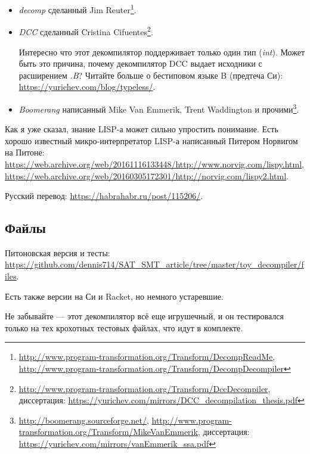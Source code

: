 \begin{itemize}
	\item \textit{decomp} сделанный Jim Reuter\footnote{
			\url{http://www.program-transformation.org/Transform/DecompReadMe},
			\url{http://www.program-transformation.org/Transform/DecompDecompiler}}.

	\item \textit{DCC} сделанный Cristina Cifuentes\footnote{
			\url{http://www.program-transformation.org/Transform/DccDecompiler},
			диссертация: \url{https://yurichev.com/mirrors/DCC_decompilation_thesis.pdf}}.

		Интересно что этот декомпилятор поддерживает только один тип (\textit{int}).
		Может быть это причина, почему декомпилятор DCC выдает исходники с расширением \textit{.B}?
		Читайте больше о бестиповом языке B (предтеча Си): \url{https://yurichev.com/blog/typeless/}.

	\item \textit{Boomerang} написанный Mike Van Emmerik, Trent Waddington и прочими\footnote{
			\url{http://boomerang.sourceforge.net/},
			\url{http://www.program-transformation.org/Transform/MikeVanEmmerik},
			диссертация: \url{https://yurichev.com/mirrors/vanEmmerik_ssa.pdf}}.
\end{itemize}

Как я уже сказал, знание LISP-а может сильно упростить понимание.
Есть хорошо известный микро-интерпретатор LISP-а написанный Питером Норвигом на Питоне:
\url{https://web.archive.org/web/20161116133448/http://www.norvig.com/lispy.html},
\url{https://web.archive.org/web/20160305172301/http://norvig.com/lispy2.html}.

Русский перевод: \url{https://habrahabr.ru/post/115206/}.

\subsection{Файлы}

Питоновская версия и тесты: \url{https://github.com/dennis714/SAT_SMT_article/tree/master/toy_decompiler/files}.

Есть также версии на Си и Racket, но немного устаревшие.

Не забывайте --- этот декомпилятор всё еще игрушечный, и он тестировался только на тех крохотных тестовых файлах,
что идут в комплекте.

